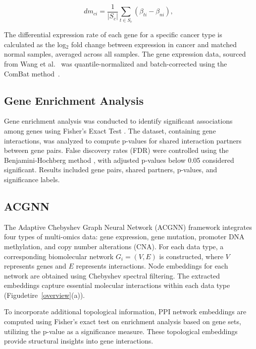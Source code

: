 \begin{equation}
	dm_{ci} = \frac{1}{|S_c|} \sum_{t \in S_c} (\beta_{ti} - \beta_{ni}),
	\label{eq:dm_ci}
\end{equation}

The differential expression rate of each gene for a specific cancer type is calculated as the log\(_2\) fold change between expression in cancer and matched normal samples, averaged across all samples. The gene expression data, sourced from Wang et al.~\cite{wang2018unifying} was quantile-normalized and batch-corrected using the ComBat method~\cite{johnson2007adjusting}. 


\subsection{Gene Enrichment Analysis}

Gene enrichment analysis was conducted to identify significant associations among genes using Fisher's Exact Test \cite{fisher1992}. The dataset, containing gene interactions, was analyzed to compute p-values for shared interaction partners between gene pairs. False discovery rates (FDR) were controlled using the Benjamini-Hochberg method \cite{benjamini1995controlling}, with adjusted p-values below 0.05 considered significant. Results included gene pairs, shared partners, p-values, and significance labels. 

\subsection{ACGNN}	
	The Adaptive Chebyshev Graph Neural Network (ACGNN) framework integrates four types of multi-omics data: gene expression, gene mutation, promoter DNA methylation, and copy number alterations (CNA). For each data type, a corresponding biomolecular network \( G_i = (V, E) \) is constructed, where \( V \) represents genes and \( E \) represents interactions. Node embeddings for each network are obtained using Chebyshev spectral filtering. The extracted embeddings capture essential molecular interactions within each data type (Figudetire~\ref{overview}(a)).
	
	To incorporate additional topological information, PPI network embeddings are computed using Fisher’s exact test on enrichment analysis based on gene sets, utilizing the p-value as a significance measure. These topological embeddings provide structural insights into gene interactions.
	
